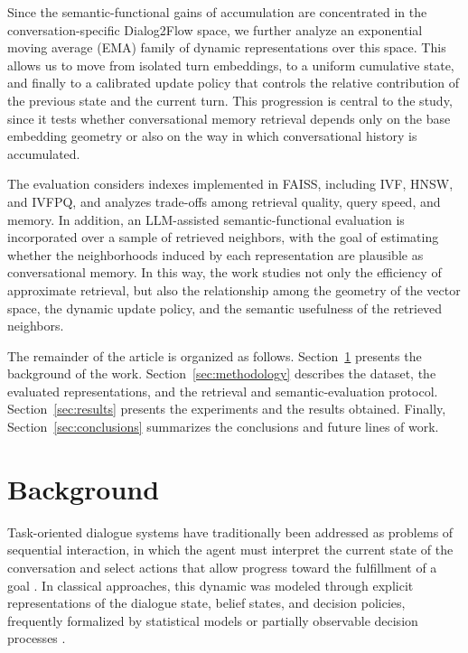 \documentclass[runningheads]{llncs}
\begin{document}
Since the semantic-functional gains of accumulation are concentrated in the conversation-specific Dialog2Flow space, we further analyze an exponential moving average (EMA) family of dynamic representations over this space. This allows us to move from isolated turn embeddings, to a uniform cumulative state, and finally to a calibrated update policy that controls the relative contribution of the previous state and the current turn. This progression is central to the study, since it tests whether conversational memory retrieval depends only on the base embedding geometry or also on the way in which conversational history is accumulated.

The evaluation considers indexes implemented in FAISS, including IVF, HNSW, and IVFPQ, and analyzes trade-offs among retrieval quality, query speed, and memory. In addition, an LLM-assisted semantic-functional evaluation is incorporated over a sample of retrieved neighbors, with the goal of estimating whether the neighborhoods induced by each representation are plausible as conversational memory. In this way, the work studies not only the efficiency of approximate retrieval, but also the relationship among the geometry of the vector space, the dynamic update policy, and the semantic usefulness of the retrieved neighbors.

The remainder of the article is organized as follows. Section~\ref{sec:background} presents the background of the work. Section~\ref{sec:methodology} describes the dataset, the evaluated representations, and the retrieval and semantic-evaluation protocol. Section~\ref{sec:results} presents the experiments and the results obtained. Finally, Section~\ref{sec:conclusions} summarizes the conclusions and future lines of work.

\section{Background}
\label{sec:background}

Task-oriented dialogue systems have traditionally been addressed as problems of sequential interaction, in which the agent must interpret the current state of the conversation and select actions that allow progress toward the fulfillment of a goal \cite{young2013pomdp}. In classical approaches, this dynamic was modeled through explicit representations of the dialogue state, belief states, and decision policies, frequently formalized by statistical models or partially observable decision processes \cite{williams2013pomdp,chen2017survey}.
\end{document}
